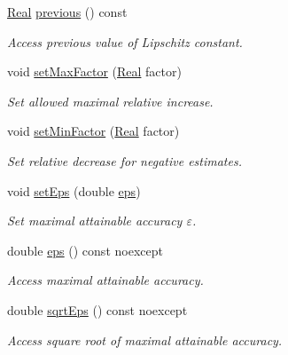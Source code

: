 \begin{DoxyCompactItemize}
\item 
\hyperlink{classSpacy_1_1Real}{Real} \hyperlink{classSpacy_1_1LipschitzConstant_a3a91ae4dea16ff7e83f1d51797145cbd_a3a91ae4dea16ff7e83f1d51797145cbd}{previous} () const 
\begin{DoxyCompactList}\small\item\em Access previous value of Lipschitz constant. \end{DoxyCompactList}\item 
void \hyperlink{classSpacy_1_1LipschitzConstant_a5e4f00a4178814300de3f2a0ac391c1c_a5e4f00a4178814300de3f2a0ac391c1c}{set\+Max\+Factor} (\hyperlink{classSpacy_1_1Real}{Real} factor)
\begin{DoxyCompactList}\small\item\em Set allowed maximal relative increase. \end{DoxyCompactList}\item 
void \hyperlink{classSpacy_1_1LipschitzConstant_ac5dbb64f6535fe26b6f5e43c95d85282_ac5dbb64f6535fe26b6f5e43c95d85282}{set\+Min\+Factor} (\hyperlink{classSpacy_1_1Real}{Real} factor)
\begin{DoxyCompactList}\small\item\em Set relative decrease for negative estimates. \end{DoxyCompactList}\item 
void \hyperlink{classSpacy_1_1Mixin_1_1Eps_a1bbfd62541610d5d80f2782ab77158e4_a1bbfd62541610d5d80f2782ab77158e4}{set\+Eps} (double \hyperlink{classSpacy_1_1Mixin_1_1Eps_a40e2ba8f3abd2b5370ef41238cfaaf8b_a40e2ba8f3abd2b5370ef41238cfaaf8b}{eps})
\begin{DoxyCompactList}\small\item\em Set maximal attainable accuracy $\varepsilon$. \end{DoxyCompactList}\item 
double \hyperlink{classSpacy_1_1Mixin_1_1Eps_a40e2ba8f3abd2b5370ef41238cfaaf8b_a40e2ba8f3abd2b5370ef41238cfaaf8b}{eps} () const noexcept
\begin{DoxyCompactList}\small\item\em Access maximal attainable accuracy. \end{DoxyCompactList}\item 
double \hyperlink{classSpacy_1_1Mixin_1_1Eps_a29e8c25dc3f1fdede57b8eb06f520fe1_a29e8c25dc3f1fdede57b8eb06f520fe1}{sqrt\+Eps} () const noexcept
\begin{DoxyCompactList}\small\item\em Access square root of maximal attainable accuracy. \end{DoxyCompactList}\item 

\end{DoxyCompactItemize}
